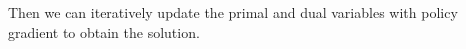 \documentclass[journal,12pt,onecolumn,draftclsnofoot]{IEEEtran}
\begin{document}
        Then we can iteratively update the primal and dual variables with policy gradient to obtain the solution.
    
        

\end{document}
